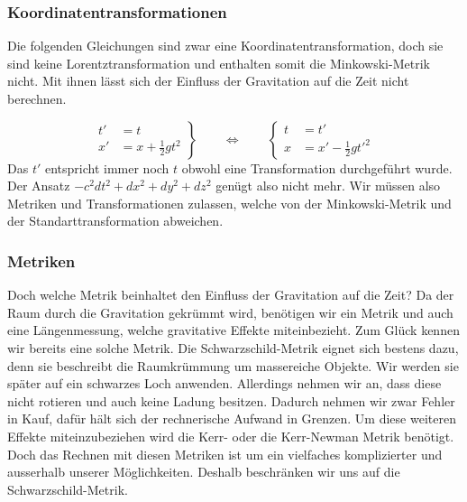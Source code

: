 \begin{refsection}
	\subsubsection{Koordinatentransformationen}
	
	Die folgenden Gleichungen sind zwar eine Koordinatentransformation, doch sie sind keine Lorentztransformation und enthalten somit die Minkowski-Metrik nicht. Mit ihnen lässt sich der Einfluss der Gravitation auf die Zeit nicht berechnen. 
	
	\begin{equation}
	\left.
	\begin{aligned}
	t'&=t\\
	x'&=x+\frac12gt^2
	\end{aligned}
	\right\}
	\qquad
	\Leftrightarrow
	\qquad
	\left\{
	\begin{aligned}
	t&=t'\\
	x&=x'-\frac12gt'^2
	\end{aligned}
	\right.
	\end{equation}
	Das $t'$ entspricht immer noch $t$ obwohl eine Transformation durchgeführt wurde. 
	Der Ansatz $ -c^2dt^2 + dx^2 + dy^2 + dz^2$ genügt also nicht mehr. Wir müssen also Metriken und Transformationen zulassen, welche von der Minkowski-Metrik und der Standarttransformation abweichen.
	
	\subsubsection{Metriken}\label{skript:chapter:zeitreisen:metriken}
	
	Doch welche Metrik beinhaltet den Einfluss der Gravitation auf die Zeit? 
	Da der Raum durch die Gravitation gekrümmt wird, benötigen wir ein Metrik und auch eine Längenmessung, welche gravitative Effekte miteinbezieht.
	Zum Glück kennen wir bereits eine solche Metrik. Die Schwarzschild-Metrik eignet sich bestens dazu, denn sie beschreibt die Raumkrümmung um massereiche Objekte. Wir werden sie später auf ein schwarzes Loch anwenden. Allerdings nehmen wir an, dass diese nicht rotieren und auch keine Ladung besitzen. Dadurch nehmen wir zwar Fehler in Kauf, dafür hält sich der rechnerische Aufwand in Grenzen. Um diese weiteren Effekte miteinzubeziehen wird die Kerr- oder die Kerr-Newman Metrik benötigt. Doch das Rechnen mit diesen Metriken ist um ein vielfaches komplizierter und ausserhalb unserer Möglichkeiten. Deshalb beschränken wir uns auf die Schwarzschild-Metrik.


\end{refsection}
